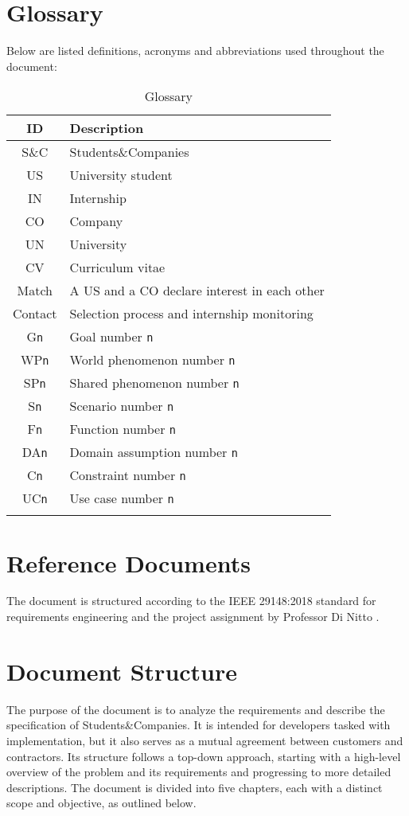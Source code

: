 \section{Glossary}
Below are listed definitions, acronyms and abbreviations used throughout the document:

\renewcommand{\arraystretch}{1.5}
\begin{longtable}{|c|p{8.5cm}|}
    \hline \rowcolor{polimiblue!40}
    \textbf{ID} & \textbf{Description} \\ \hline
    S\&C & Students\&Companies \\ \hline
    US & University student \\ \hline
    IN & Internship \\ \hline
    CO & Company \\ \hline
    UN & University \\ \hline
    CV & Curriculum vitae \\ \hline
    Match & A US and a CO declare interest in each other \\ \hline
    Contact & Selection process and internship monitoring \\ \hline
    G\texttt{n} & Goal number \texttt{n} \\ \hline
    WP\texttt{n} & World phenomenon number \texttt{n} \\ \hline
    SP\texttt{n} & Shared phenomenon number \texttt{n} \\ \hline
    S\texttt{n} & Scenario number \texttt{n} \\ \hline
    F\texttt{n} & Function number \texttt{n} \\ \hline
    DA\texttt{n} & Domain assumption number \texttt{n} \\ \hline
    C\texttt{n} & Constraint number \texttt{n} \\ \hline
    UC\texttt{n} & Use case number \texttt{n} \\ \hline
\caption{Glossary}
\end{longtable}

\section{Reference Documents}
The document is structured according to the IEEE 29148:2018 standard for requirements engineering \cite{ieee2018} and the project assignment by Professor Di Nitto \cite{dinitto2024}.

\section{Document Structure}
The purpose of the document is to analyze the requirements and describe the specification of Students\&Companies.
It is intended for developers tasked with implementation, but it also serves as a mutual agreement between customers and contractors.
Its structure follows a top-down approach, starting with a high-level overview of the problem and its requirements and progressing to more detailed descriptions.
The document is divided into five chapters, each with a distinct scope and objective, as outlined below.

